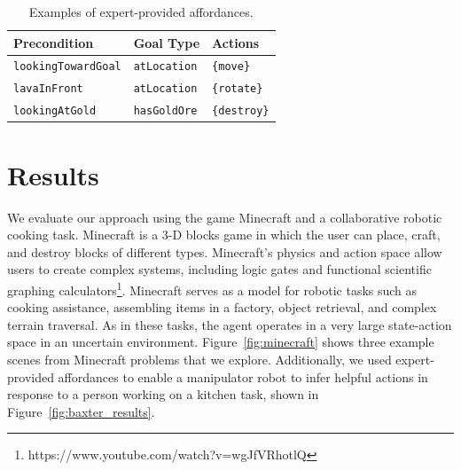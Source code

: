 \documentclass[letterpaper]{article}
\newcommand{\ra}[1]{\renewcommand{\arraystretch}{#1}} %
\begin{document}


\begin{table}[t]
\ra{1.15}
\small
\centering
\begin{tabular}{@{}lll}\toprule
Precondition & Goal Type & Actions \\ \midrule
\texttt{lookingTowardGoal} & \texttt{atLocation} & \texttt{\{move\}} \\
\texttt{lavaInFront} & \texttt{atLocation} & \texttt{\{rotate\}} \\
\texttt{lookingAtGold} & \texttt{hasGoldOre} & \texttt{\{destroy\}} \\
\bottomrule
\end{tabular}

\caption{Examples of expert-provided affordances.\label{table:afford_kb_exp}}
\end{table}



\section{Results}
\label{sec:results}


We evaluate our approach using the game Minecraft and a collaborative
robotic cooking task.  Minecraft is a 3-D blocks game in which the
user can place, craft, and destroy blocks of different types.
Minecraft's physics and action space allow users to create complex
systems, including logic gates and functional scientific graphing
calculators\footnote{https://www.youtube.com/watch?v=wgJfVRhotlQ}.
Minecraft serves as a model for robotic tasks such as cooking
assistance, assembling items in a factory, object retrieval, and
complex terrain traversal.  As in these tasks, the agent operates in a
very large state-action space in an uncertain environment.
Figure~\ref{fig:minecraft} shows three example scenes from Minecraft
problems that we explore.  Additionally, we used expert-provided affordances to
enable a manipulator robot to infer helpful actions in response to a
person working on a kitchen task, shown in Figure~\ref{fig:baxter_results}.
\end{document}
